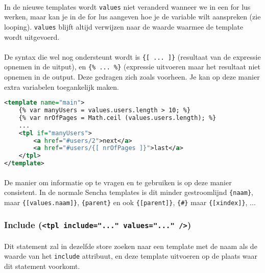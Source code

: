 \paragraph {} In de nieuwe templates wordt \lstinline{values} niet veranderd wanneer we
in een for lus werken, maar kan je in de for lus aangeven hoe je de variable wilt
aanspreken (zie looping). \lstinline{values} blijft altijd verwijzen naar de waarde
waarmee de template wordt uitgevoerd.

\paragraph {} De syntax die wel nog ondersteunt wordt is \lstinline|{[ ... ]}| (resultaat
van de expressie opnemen in de uitput), en \lstinline|{% ... %}| (expressie uitvoeren maar
het resultaat niet opnemen in de output. Deze gedragen zich zoals voorheen. Je kan op deze
manier extra variabelen toegankelijk maken.

\begin{lstlisting}[language=xml]
<template name="main">
	{% var manyUsers = values.users.length > 10; %}
	{% var nrOfPages = Math.ceil (values.users.length); %}
	...
	<tpl if="manyUsers">
		<a href="#users/2">next</a>
		<a href="#users/{[ nrOfPages ]}">last</a>
	</tpl>
</template>
\end{lstlisting}

\paragraph {} De manier om informatie op te vragen en te gebruiken is op deze manier
consistent. In de normale Sencha templates is dit minder gestroomlijnd \lstinline|{naam}|,
maar \lstinline|{[values.naam]}|, \lstinline|{parent}| en ook \lstinline|{[parent]}|,
\lstinline|{#}| maar \lstinline|{[xindex]}|, ...


\subsubsection {Include (\lstinline{<tpl include="..." values="..." />})}

\paragraph {} Dit statement zal in dezelfde store zoeken naar een template met de naam als
de waarde van het \lstinline{include} attribuut, en deze template uitvoeren op de plaats
waar dit statement voorkomt.

